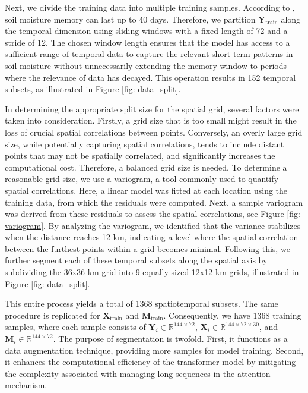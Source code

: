 \documentclass[11pt]{article}
\begin{document}
Next, we divide the training data into multiple training samples. According to \citet{orth2012analysis}, soil moisture memory can last up to 40 days. Therefore, we partition $\boldsymbol{Y}_{\text{train}}$ along the temporal dimension using sliding windows with a fixed length of 72 and a stride of 12.  The chosen window length ensures that the model has access to a sufficient range of temporal data to capture the relevant short-term patterns in soil moisture without unnecessarily extending the memory window to periods where the relevance of data has decayed. This operation results in 152 temporal subsets, as illustrated in Figure \ref{fig: data_split}.

In determining the appropriate split size for the spatial grid, several factors were taken into consideration. Firstly, a grid size that is too small might result in the loss of crucial spatial correlations between points. Conversely, an overly large grid size, while potentially capturing spatial correlations, tends to include distant points that may not be spatially correlated, and significantly increases the computational cost. Therefore, a balanced grid size is needed. To determine a reasonable grid size, we use a variogram, a tool commonly used to quantify spatial correlations. Here, a linear model was fitted at each location using the training data, from which the residuals were computed. Next, a sample variogram was derived from these residuals to assess the spatial correlations, see Figure \ref{fig: variogram}. By analyzing the variogram, we identified that the variance stabilizes when the distance reaches 12 km, indicating a level where the spatial correlation between the furthest points within a grid becomes minimal. Following this, we further segment each of these temporal subsets along the spatial axis by subdividing the 36x36 km grid into 9 equally sized 12x12 km grids, illustrated in Figure \ref{fig: data_split}. 

This entire process yields a total of 1368 spatiotemporal subsets. The same procedure is replicated for $\boldsymbol{X}_{\text{train}}$ and $\boldsymbol{M}_{\text{train}}$. Consequently, we have 1368 training samples, where each sample consists of $\boldsymbol{Y}_i \in \mathbb{R}^{144\times 72}$, $\boldsymbol{X}_i \in \mathbb{R}^{144 \times 72 \times 30}$, and $\boldsymbol{M}_i \in \mathbb{R}^{144 \times 72}$. The purpose of segmentation is twofold. First, it functions as a data augmentation technique, providing more samples for model training. Second, it enhances the computational efficiency of the transformer model by mitigating the complexity associated with managing long sequences in the attention mechanism. 
\end{document}
